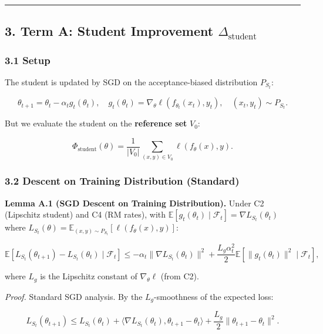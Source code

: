 \documentclass[
  12pt,
]{ctexart}
\begin{document}
\begin{center}\rule{0.5\linewidth}{0.5pt}\end{center}

\subsection{\texorpdfstring{3. Term A: Student Improvement
\(\Delta_{\text{student}}\)}{3. Term A: Student Improvement \textbackslash Delta\_\{\textbackslash text\{student\}\}}}\label{term-a-student-improvement-delta_textstudent}

\subsubsection{3.1 Setup}\label{setup}

The student is updated by SGD on the acceptance-biased distribution
\(P_{S_t}\):

\[\theta_{t+1} = \theta_t - \alpha_t g_t(\theta_t), \quad g_t(\theta_t) = \nabla_\theta \ell(f_{\theta_t}(x_t), y_t), \quad (x_t, y_t) \sim P_{S_t}.\]

But we evaluate the student on the \textbf{reference set} \(V_0\):

\[\Phi_{\text{student}}(\theta) = \frac{1}{|V_0|} \sum_{(x,y) \in V_0} \ell(f_\theta(x), y).\]

\subsubsection{3.2 Descent on Training Distribution
(Standard)}\label{descent-on-training-distribution-standard}

\textbf{Lemma A.1 (SGD Descent on Training Distribution).} Under C2
(Lipschitz student) and C4 (RM rates), with
\(\mathbb{E}[g_t(\theta_t) \mid \mathcal{F}_t] = \nabla L_{S_t}(\theta_t)\)
where
\(L_{S_t}(\theta) = \mathbb{E}_{(x,y) \sim P_{S_t}}[\ell(f_\theta(x), y)]\):

\[\mathbb{E}[L_{S_t}(\theta_{t+1}) - L_{S_t}(\theta_t) \mid \mathcal{F}_t] \leq -\alpha_t \|\nabla L_{S_t}(\theta_t)\|^2 + \frac{L_g \alpha_t^2}{2} \mathbb{E}[\|g_t(\theta_t)\|^2 \mid \mathcal{F}_t],\]

where \(L_g\) is the Lipschitz constant of \(\nabla_\theta \ell\) (from
C2).

\emph{Proof.} Standard SGD analysis. By the \(L_g\)-smoothness of the
expected loss:

\[L_{S_t}(\theta_{t+1}) \leq L_{S_t}(\theta_t) + \langle \nabla L_{S_t}(\theta_t), \theta_{t+1} - \theta_t \rangle + \frac{L_g}{2} \|\theta_{t+1} - \theta_t\|^2.\]
\end{document}
